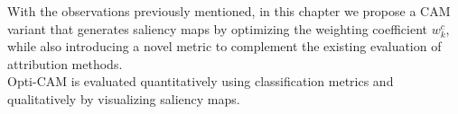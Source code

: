 \noindent With the observations previously mentioned, in this chapter we propose a CAM variant that 
generates saliency maps by optimizing the weighting coefficient $w_k^c$, while also introducing a 
novel metric to complement the existing evaluation of attribution methods.\\




Opti-CAM is evaluated quantitatively using classification metrics and qualitatively by visualizing
 saliency maps.











